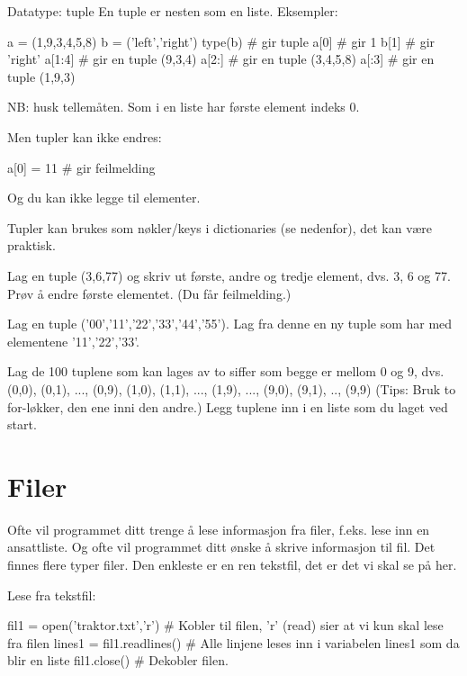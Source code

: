 Datatype: tuple
En tuple er nesten som en liste.
Eksempler: 
\begin{usncodebox}
a = (1,9,3,4,5,8)
b = ('left','right')
type(b)    # gir tuple
a[0]       # gir 1 
b[1]       # gir 'right'
a[1:4]     # gir en tuple (9,3,4)
a[2:]      # gir en tuple (3,4,5,8)
a[:3]      # gir en tuple (1,9,3)
\end{usncodebox}

NB: husk tellemåten. Som i en liste har første element indeks 0. 

Men tupler kan ikke endres:
\begin{usncodebox}
a[0] = 11  # gir feilmelding
\end{usncodebox}

Og du kan ikke legge til elementer. 

Tupler kan brukes som nøkler/keys i dictionaries (se nedenfor), det kan være praktisk. 

\begin{exercise}
Lag en tuple (3,6,77) og skriv ut første, andre og tredje element, dvs. 3, 6 og 77.
Prøv å endre første elementet. (Du får feilmelding.) 
\end{exercise}

\begin{exercise}
Lag en tuple ('00','11','22','33','44','55'). Lag fra denne en ny tuple som har med elementene '11','22','33'. 
\end{exercise}

\begin{exercise}
Lag de 100 tuplene som kan lages av to siffer som begge er mellom 0 og 9, dvs. (0,0), (0,1), ..., (0,9), (1,0), (1,1), ..., (1,9), ..., (9,0), (9,1), .., (9,9)
(Tips: Bruk to for-løkker, den ene inni den andre.)
Legg tuplene inn i en liste som du laget ved start.
\end{exercise}

\section{Filer}

Ofte vil programmet ditt trenge å lese informasjon fra filer, f.eks. lese inn en ansattliste. Og ofte vil programmet ditt ønske å skrive informasjon til fil. Det finnes flere typer filer. Den enkleste er en ren tekstfil, det er det vi skal se på her. 

Lese fra tekstfil:
\begin{usncodebox}
fil1 = open('traktor.txt','r')    # Kobler til filen, 'r' (read) sier at vi kun skal lese fra filen
lines1 = fil1.readlines()         # Alle linjene leses inn i variabelen lines1 som da blir en liste
fil1.close()                      # Dekobler filen. 
\end{usncodebox}

